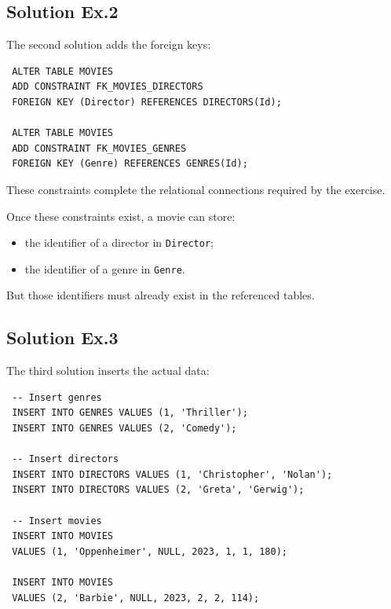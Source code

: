  \subsection{Solution Ex.2}

 The second solution adds the foreign keys:

 \begin{verbatim}
 ALTER TABLE MOVIES
 ADD CONSTRAINT FK_MOVIES_DIRECTORS
 FOREIGN KEY (Director) REFERENCES DIRECTORS(Id);

 ALTER TABLE MOVIES
 ADD CONSTRAINT FK_MOVIES_GENRES
 FOREIGN KEY (Genre) REFERENCES GENRES(Id);
 \end{verbatim}
 \vspace{-0.4cm}

 These constraints complete the relational connections required by the exercise.

 \begin{example}
  Once these constraints exist, a movie can store:
  \begin{itemize}
   \item the identifier of a director in \texttt{Director};
   \vspace{0.2cm}
   \item the identifier of a genre in \texttt{Genre}.
  \end{itemize}

  But those identifiers must already exist in the referenced tables.
 \end{example}

 \subsection{Solution Ex.3}

 The third solution inserts the actual data:

 \begin{verbatim}
 -- Insert genres
 INSERT INTO GENRES VALUES (1, 'Thriller');
 INSERT INTO GENRES VALUES (2, 'Comedy');

 -- Insert directors
 INSERT INTO DIRECTORS VALUES (1, 'Christopher', 'Nolan');
 INSERT INTO DIRECTORS VALUES (2, 'Greta', 'Gerwig');

 -- Insert movies
 INSERT INTO MOVIES
 VALUES (1, 'Oppenheimer', NULL, 2023, 1, 1, 180);

 INSERT INTO MOVIES
 VALUES (2, 'Barbie', NULL, 2023, 2, 2, 114);
 \end{verbatim}
 \vspace{-0.4cm}

